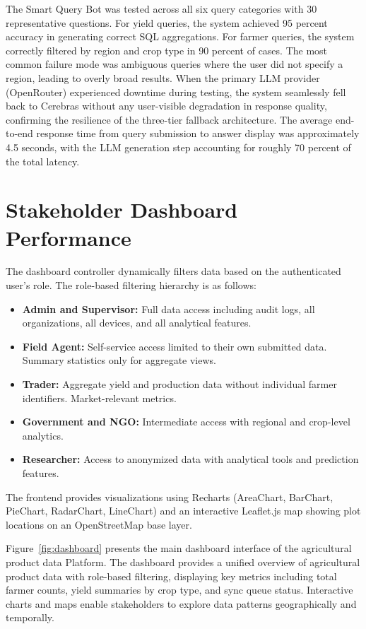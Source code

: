 \documentclass[12pt,a4paper,oneside]{report}
\begin{document}
The Smart Query Bot was tested across all six query categories with 30 representative questions. For yield queries, the system achieved 95 percent accuracy in generating correct SQL aggregations. For farmer queries, the system correctly filtered by region and crop type in 90 percent of cases. The most common failure mode was ambiguous queries where the user did not specify a region, leading to overly broad results. When the primary LLM provider (OpenRouter) experienced downtime during testing, the system seamlessly fell back to Cerebras without any user-visible degradation in response quality, confirming the resilience of the three-tier fallback architecture. The average end-to-end response time from query submission to answer display was approximately 4.5 seconds, with the LLM generation step accounting for roughly 70 percent of the total latency.

\section{Stakeholder Dashboard Performance}
The dashboard controller dynamically filters data based on the authenticated user's role. The role-based filtering hierarchy is as follows:

\begin{itemize}
  \item \textbf{Admin and Supervisor:} Full data access including audit logs, all organizations, all devices, and all analytical features.
  \item \textbf{Field Agent:} Self-service access limited to their own submitted data. Summary statistics only for aggregate views.
  \item \textbf{Trader:} Aggregate yield and production data without individual farmer identifiers. Market-relevant metrics.
  \item \textbf{Government and NGO:} Intermediate access with regional and crop-level analytics.
  \item \textbf{Researcher:} Access to anonymized data with analytical tools and prediction features.
\end{itemize}

The frontend provides visualizations using Recharts (AreaChart, BarChart, PieChart, RadarChart, LineChart) and an interactive Leaflet.js map showing plot locations on an OpenStreetMap base layer.

Figure~\ref{fig:dashboard} presents the main dashboard interface of the agricultural product data Platform. The dashboard provides a unified overview of agricultural product data with role-based filtering, displaying key metrics including total farmer counts, yield summaries by crop type, and sync queue status. Interactive charts and maps enable stakeholders to explore data patterns geographically and temporally.
\end{document}
